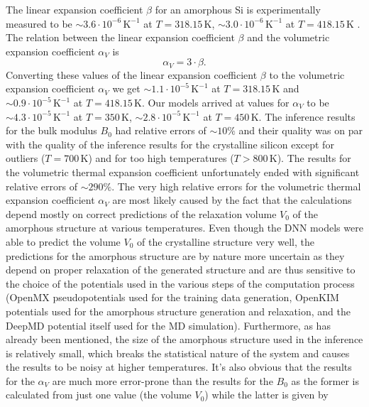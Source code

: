 The linear expansion coefficient $\beta$ for an amorphous Si is experimentally
measured to be $\sim 3.6 \cdot 10^{-6} \, \mathrm{K}^{-1}$ at
$T = 318.15 \, \mathrm{K}$, $\sim 3.0 \cdot 10^{-6} \, \mathrm{K}^{-1}$ at
$T = 418.15 \, \mathrm{K}$ \cite{TAKIMOTO2002314}. The relation between the
linear expansion coefficient $\beta$ and the volumetric expansion coefficient
$\alpha_V$ is
\begin{equation}
  \alpha_V = 3 \cdot \beta.
\end{equation}
Converting these values of the linear expansion coefficient $\beta$ to the
volumetric expansion coefficient $\alpha_V$ we get
$\sim 1.1 \cdot 10^{-5} \, \mathrm{K}^{-1}$ at $T = 318.15 \, \mathrm{K}$ and
$\sim 0.9 \cdot 10^{-5} \, \mathrm{K}^{-1}$ at $T = 418.15 \, \mathrm{K}$.
Our models arrived at values for $\alpha_V$ to be
$\sim 4.3 \cdot 10^{-5} \, \mathrm{K}^{-1}$ at
$T = 350 \, \mathrm{K}$, $\sim 2.8 \cdot 10^{-5} \, \mathrm{K}^{-1}$ at
$T = 450 \, \mathrm{K}$. The inference results for the bulk modulus $B_0$ had
relative errors of $\sim 10 \%$ and their quality was on par with the quality
of the inference results for the crystalline silicon except for outliers
($T = 700 \, \mathrm{K}$) and for too high temperatures
($T > 800 \, \mathrm{K}$). The results for the volumetric thermal expansion
coefficient unfortunately ended with significant relative errors of
$\sim 290 \%$. The very high relative errors for the volumetric
thermal expansion coefficient $\alpha_V$ are most likely caused by the fact
that the calculations depend mostly on correct predictions of the relaxation
volume $V_0$ of the amorphous structure at various temperatures. Even though
the DNN models were able to predict the volume $V_0$ of the crystalline
structure very well, the predictions for the amorphous structure are by nature
more uncertain as they depend on proper relaxation of the generated structure
and are thus sensitive to the choice of the potentials used in the
various steps of the computation process (OpenMX pseudopotentials used for
the training data generation, OpenKIM potentials used for the amorphous
structure generation and relaxation, and the DeepMD potential itself used for
the MD simulation). Furthermore, as has already been mentioned, the size of
the amorphous structure used in the inference is relatively small, which
breaks the statistical nature of the system and causes the results to be noisy
at higher temperatures. It's also obvious that the results for the $\alpha_V$
are much more error-prone than the results for the $B_0$ as the former is
calculated from just one value (the volume $V_0$) while the latter is given by
